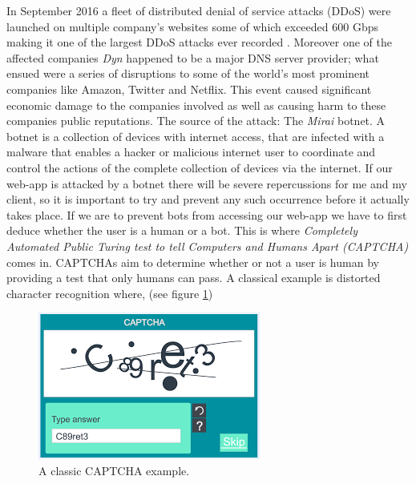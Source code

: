 In September 2016 a fleet of distributed denial of service 
attacks (DDoS) were launched on multiple company's websites 
some of which exceeded 600 Gbps making it one of the largest 
DDoS attacks ever recorded \cite{mirai}. Moreover one of the 
affected companies \textit{Dyn} happened to be a major DNS
server provider; what ensued were a series of disruptions to 
some of the world's most prominent companies like Amazon, 
Twitter and Netflix. This event caused significant economic 
damage to the companies involved as well as causing harm to 
these companies public reputations. The source of the attack:
The \textit{Mirai} botnet. A botnet is a collection of 
devices with internet access, that are infected with a malware
that enables a hacker or malicious internet user to coordinate
and control the actions of the complete collection of devices
via the internet. If our web-app is attacked by a botnet 
there will be severe repercussions for me and my client, so 
it is important to try and prevent any such occurrence before
it actually takes place. If we are to prevent bots from 
accessing our web-app we have to first deduce whether the user
is a human or a bot. This is where \textit{Completely
Automated Public Turing test to tell Computers and Humans
Apart (CAPTCHA)} comes in. CAPTCHAs aim to determine whether
or not a user is human by providing a test that only humans 
can pass. A classical example is distorted character 
recognition where, (see figure \ref{fig:captcha})
\\ \vspace{0.2cm}

\begin{figure}[h]
  \centering
  \includegraphics[scale=0.75]{Images/Captcha.png}
  \caption{A classic CAPTCHA example.}
  \label{fig:captcha}
\end{figure}

